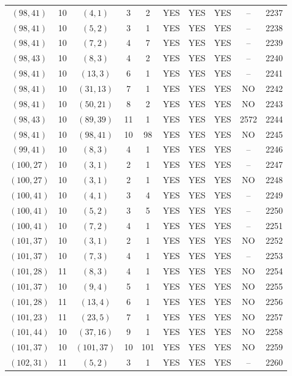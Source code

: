 \begin{longtable}{|c|c|c|c|c|c|c|c|c|c|}
$(98, 41)$ & 10 & $(4, 1)$ & 3 & 2 & YES & YES & YES & -- & 2237\\
$(98, 41)$ & 10 & $(5, 2)$ & 3 & 1 & YES & YES & YES & -- & 2238\\
$(98, 41)$ & 10 & $(7, 2)$ & 4 & 7 & YES & YES & YES & -- & 2239\\
$(98, 43)$ & 10 & $(8, 3)$ & 4 & 2 & YES & YES & YES & -- & 2240\\
$(98, 41)$ & 10 & $(13, 3)$ & 6 & 1 & YES & YES & YES & -- & 2241\\
$(98, 41)$ & 10 & $(31, 13)$ & 7 & 1 & YES & YES & YES & NO & 2242\\
$(98, 41)$ & 10 & $(50, 21)$ & 8 & 2 & YES & YES & YES & NO & 2243\\
$(98, 43)$ & 10 & $(89, 39)$ & 11 & 1 & YES & YES & YES & 2572 & 2244\\
$(98, 41)$ & 10 & $(98, 41)$ & 10 & 98 & YES & YES & YES & NO & 2245\\
$(99, 41)$ & 10 & $(8, 3)$ & 4 & 1 & YES & YES & YES & -- & 2246\\
$(100, 27)$ & 10 & $(3, 1)$ & 2 & 1 & YES & YES & YES & -- & 2247\\
$(100, 27)$ & 10 & $(3, 1)$ & 2 & 1 & YES & YES & YES & NO & 2248\\
$(100, 41)$ & 10 & $(4, 1)$ & 3 & 4 & YES & YES & YES & -- & 2249\\
$(100, 41)$ & 10 & $(5, 2)$ & 3 & 5 & YES & YES & YES & -- & 2250\\
$(100, 41)$ & 10 & $(7, 2)$ & 4 & 1 & YES & YES & YES & -- & 2251\\
$(101, 37)$ & 10 & $(3, 1)$ & 2 & 1 & YES & YES & YES & NO & 2252\\
$(101, 37)$ & 10 & $(7, 3)$ & 4 & 1 & YES & YES & YES & -- & 2253\\
$(101, 28)$ & 11 & $(8, 3)$ & 4 & 1 & YES & YES & YES & NO & 2254\\
$(101, 37)$ & 10 & $(9, 4)$ & 5 & 1 & YES & YES & YES & NO & 2255\\
$(101, 28)$ & 11 & $(13, 4)$ & 6 & 1 & YES & YES & YES & NO & 2256\\
$(101, 23)$ & 11 & $(23, 5)$ & 7 & 1 & YES & YES & YES & NO & 2257\\
$(101, 44)$ & 10 & $(37, 16)$ & 9 & 1 & YES & YES & YES & NO & 2258\\
$(101, 37)$ & 10 & $(101, 37)$ & 10 & 101 & YES & YES & YES & NO & 2259\\
$(102, 31)$ & 11 & $(5, 2)$ & 3 & 1 & YES & YES & YES & -- & 2260\\

\end{longtable}
